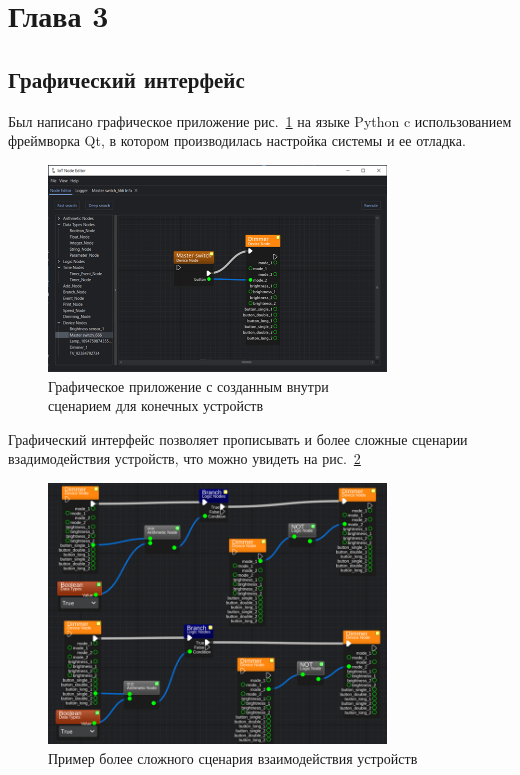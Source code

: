 \documentclass[14pt,a4paper]{extarticle}
\begin{document}
\section{Глава 3}

\subsection{Графический интерфейс}
Был написано графическое приложение рис.~\ref{fig:GUI_base} на языке Python c использованием фреймворка Qt, в котором производилась настройка системы и ее отладка.

\begin{figure}[H]
    \centering
    \includegraphics[width=0.8\textwidth]{images/Fig11.png}
    \captionsetup{justification=centering}
    \caption{Графическое приложение с созданным внутри\\сценарием для конечных устройств}
    \label{fig:GUI_base}
\end{figure}

Графический интерфейс позволяет прописывать и более сложные сценарии взадимодействия устройств, что можно увидеть на рис.~\ref{fig:GUI_adv}

\begin{figure}[H]
    \centering
    \includegraphics[width=0.8\textwidth]{images/Fig12.png}
    \caption{Пример более сложного сценария взаимодействия устройств}
    \label{fig:GUI_adv}
\end{figure}
\end{document}
